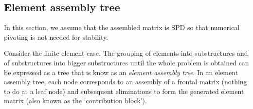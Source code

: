 \subsection{Element assembly tree}
In this section, we assume that the assembled matrix is 
SPD so that numerical pivoting is not 
needed for stability.
\begin{defn}
    Consider the finite-element case. The grouping of elements 
    into substructures and of substructures into bigger 
    substructures until the whole problem is obtained can be 
    expressed as a tree that is know as an \textit{element 
    assembly tree}. In an element assembly tree, each node 
    corresponds to an assembly of a frontal matrix (nothing to 
    do at a leaf node) and subsequent eliminations to form the 
    generated element matrix (also known as the `contribution 
    block').
\end{defn}

